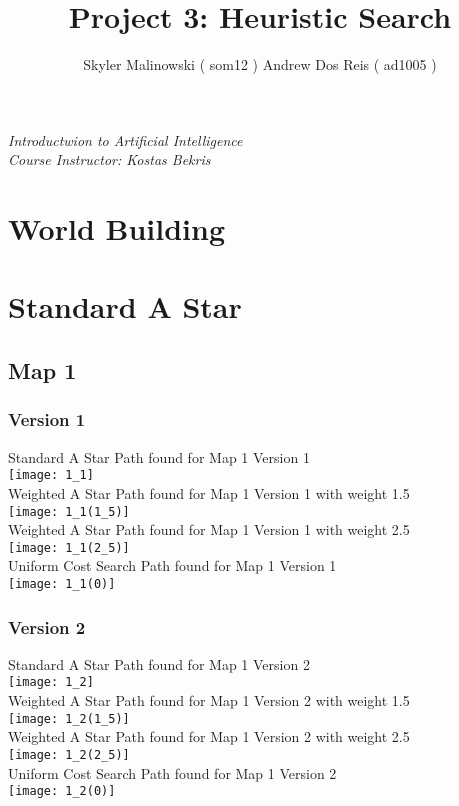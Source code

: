 \documentclass[11pt, oneside]{article}   	%
\title{Project 3: Heuristic Search}
\author{Skyler Malinowski    ( som12 )
     Andrew Dos Reis    ( ad1005 )}
\begin{document}
\maketitle
\emph{Introductwion to Artificial Intelligence}
\\

\emph{Course Instructor:    Kostas Bekris}
\newpage

\section{World Building}
\newpage
\section{Standard A Star}
\subsection{Map 1}
\subsubsection{Version 1}
Standard A Star Path found for Map 1 Version 1
\\
\texttt{[image: 1\_1]}
\\
Weighted A Star Path found for Map 1 Version 1 with weight 1.5
\\
\texttt{[image: 1\_1(1\_5)]}
\\
Weighted A Star Path found for Map 1 Version 1 with weight 2.5
\\
\texttt{[image: 1\_1(2\_5)]}
\\
Uniform Cost Search Path found for Map 1 Version 1
\\
\texttt{[image: 1\_1(0)]}
\\
\subsubsection{Version 2}
Standard A Star Path found for Map 1 Version 2
\\
\texttt{[image: 1\_2]}
\\
Weighted A Star Path found for Map 1 Version 2 with weight 1.5
\\
\texttt{[image: 1\_2(1\_5)]}
\\
Weighted A Star Path found for Map 1 Version 2 with weight 2.5
\\
\texttt{[image: 1\_2(2\_5)]}
\\
Uniform Cost Search Path found for Map 1 Version 2
\\
\texttt{[image: 1\_2(0)]}
\\
\end{document}
